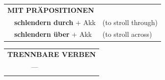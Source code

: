 \documentclass[10pt,a4paper]{revtex4-2}
\begin{document}
\begin{verbbox}
\vspace{10pt}

\begin{tabular}{lll}
\multicolumn{3}{l}{\textbf{MIT PRÄPOSITIONEN}}\\
& \textbf{schlendern durch} + Akk & (to stroll through)\\
& \textbf{schlendern über} + Akk & (to stroll across)\\
\end{tabular}
\hfill
\begin{tabular}{lll}
\multicolumn{3}{l}{\textbf{TRENNBARE VERBEN}}\\
& ---\\
\vspace{10pt}
\end{tabular}

\vspace{-5pt}
\end{verbbox}
\end{document}

